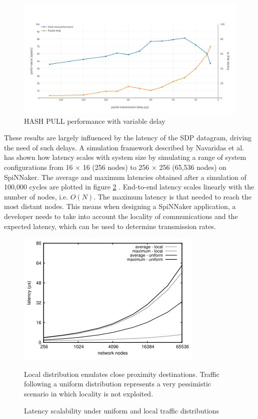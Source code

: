 \begin{figure}
\begin{center}
	\includegraphics[width=1.3\textwidth, natwidth=1063, natheight=550]{images/hash_performance.png}
\end{center}
\caption{HASH PULL performance with variable delay}
\label{fig:hash-performance}
\end{figure}

These results are largely influenced by the latency of the SDP datagram, driving the need of such delays. A simulation framework described by Navaridas et al. \cite{impacttraffic} has shown how latency scales with system size by simulating a range of system configurations from 16 × 16 (256 nodes) to 256 × 256 (65,536 nodes) on SpiNNaker. The average and maximum latencies obtained after a simulation of 100,000 cycles are plotted in figure \ref{fig:latency} \cite{scalablecomm}. End-to-end latency scales linearly with the number of nodes, i.e. $O(N)$. The maximum latency is that needed to reach the most distant nodes. This means when designing a SpiNNaker application, a developer needs to take into account the locality of communications and the expected latency, which can be used to determine transmission rates.

\begin{figure}
\begin{center}
	\includegraphics[width=.7\textwidth, natwidth=336, natheight=243]{images/latency.png}
\end{center}
\caption{Latency scalability under uniform and local traffic distributions \cite{scalablecomm}}
\medskip
\footnotesize
Local distribution emulates close proximity destinations. Traffic following a uniform distribution represents a very pessimistic scenario in which locality is not exploited.
\label{fig:latency}
\end{figure}

